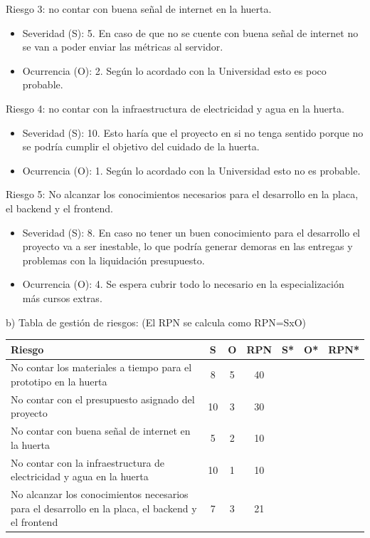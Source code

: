 \documentclass[
11pt, %
codirector, %
]{charter}
\begin{document}
Riesgo 3: no contar con buena señal de internet en la huerta.
\begin{itemize}
	\item Severidad (S): 5.
	En caso de que no se cuente con buena señal de internet no se van a poder enviar las métricas al servidor.
	\item Ocurrencia (O): 2.
	Según lo acordado con la Universidad esto es poco probable.
\end{itemize}

Riesgo 4: no contar con la infraestructura de electricidad y agua en la huerta.
\begin{itemize}
	\item Severidad (S): 10.
	Esto haría que el proyecto en si no tenga sentido porque no se podría cumplir el objetivo del cuidado de la huerta.
	\item Ocurrencia (O): 1.
	Según lo acordado con la Universidad esto no es probable.
\end{itemize}

Riesgo 5: No alcanzar los conocimientos necesarios para el desarrollo en la placa, el backend y el frontend.
\begin{itemize}
	\item Severidad (S): 8.
	En caso no tener un buen conocimiento para el desarrollo el proyecto va a ser inestable, lo que podría generar demoras en las entregas y problemas con la liquidación presupuesto.
	\item Ocurrencia (O): 4.
	Se espera cubrir todo lo necesario en la especialización más cursos extras.
\end{itemize}

b) Tabla de gestión de riesgos:      (El RPN se calcula como RPN=SxO)

\begin{table}[htpb]
\centering
\begin{tabularx}{\linewidth}{@{}|X|c|c|c|c|c|c|@{}}
\hline
\rowcolor[HTML]{C0C0C0} 
Riesgo & S & O & RPN & S* & O* & RPN* \\ \hline
      No contar los materiales a tiempo para el prototipo en la huerta &   8&   5&     40&    &    &      \\ \hline
      No contar con el presupuesto asignado del proyecto &   10&   3&     30&    &    &      \\ \hline
      No contar con buena señal de internet en la huerta &   5&   2&     10&    &    &      \\ \hline
      No contar con la infraestructura de electricidad y agua en la huerta &  10 &   1&     10&    &    &      \\ \hline
      No alcanzar los conocimientos necesarios para el desarrollo en la placa, el backend y el frontend &  7 &  3 & 21 &    &    &      \\ \hline
\end{tabularx}%
\end{table}
\end{document}
